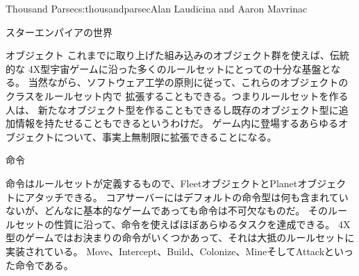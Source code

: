 \begin{aosachapter}{Thousand Parsec}{s:thousandparsec}{Alan Laudicina and Aaron Mavrinac}
\begin{aosasect1}{スターエンパイアの世界}
\begin{aosasect2}{オブジェクト}
これまでに取り上げた組み込みのオブジェクト群を使えば、伝統的な
4X型宇宙ゲームに沿った多くのルールセットにとっての十分な基盤となる。
当然ながら、ソフトウェア工学の原則に従って、これらのオブジェクトのクラスをルールセット内で
拡張することもできる。つまりルールセットを作る人は、
新たなオブジェクト型を作ることもできるし既存のオブジェクト型に追加情報を持たせることもできるというわけだ。
ゲーム内に登場するあらゆるオブジェクトについて、事実上無制限に拡張できることになる。

\end{aosasect2}

\begin{aosasect2}{命令}

命令はルールセットが定義するもので、FleetオブジェクトとPlanetオブジェクトにアタッチできる。
コアサーバーにはデフォルトの命令型は何も含まれていないが、どんなに基本的なゲームであっても命令は不可欠なものだ。
そのルールセットの性質に沿って、命令を使えばほぼあらゆるタスクを達成できる。
4X型のゲームではお決まりの命令がいくつかあって、それは大抵のルールセットに実装されている。
Move、Intercept、Build、Colonize、MineそしてAttackといった命令である。


\end{aosasect2}
\end{aosasect1}
\end{aosachapter}
